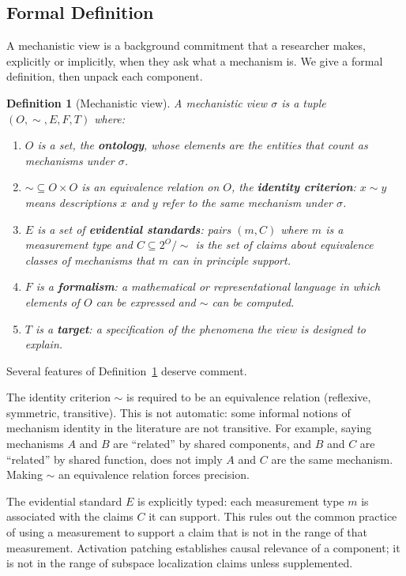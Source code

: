 \documentclass[11pt]{article}
\newtheorem{definition}{Definition}[section]
\theoremstyle{remark}
\newcommand{\view}{\sigma}
\begin{document}
\subsection{Formal Definition}

A mechanistic view is a background commitment that a researcher makes,
explicitly or implicitly, when they ask what a mechanism is.  We give
a formal definition, then unpack each component.

\begin{definition}[Mechanistic view]\label{def:view}
A \emph{mechanistic view} $\view$ is a tuple $(O, {\sim}, E, F, T)$
where:
\begin{enumerate}[leftmargin=*, label=(\roman*)]
\item $O$ is a set, the \textbf{ontology}, whose elements are the
      entities that count as mechanisms under $\view$.
\item ${\sim} \subseteq O \times O$ is an equivalence relation on $O$,
      the \textbf{identity criterion}: $x \sim y$ means descriptions $x$
      and $y$ refer to the same mechanism under $\view$.
\item $E$ is a set of \textbf{evidential standards}: pairs
      $(m, C)$ where $m$ is a measurement type and $C \subseteq
      2^O/{\sim}$ is the set of claims about equivalence classes of
      mechanisms that $m$ can in principle support.
\item $F$ is a \textbf{formalism}: a mathematical or representational
      language in which elements of $O$ can be expressed and $\sim$ can
      be computed.
\item $T$ is a \textbf{target}: a specification of the phenomena the
      view is designed to explain.
\end{enumerate}
\end{definition}

Several features of Definition~\ref{def:view} deserve comment.

The identity criterion $\sim$ is required to be an equivalence relation
(reflexive, symmetric, transitive).  This is not automatic: some
informal notions of mechanism identity in the literature are not
transitive.  For example, saying mechanisms $A$ and $B$ are ``related''
by shared components, and $B$ and $C$ are ``related'' by shared
function, does not imply $A$ and $C$ are the same mechanism.  Making
$\sim$ an equivalence relation forces precision.

The evidential standard $E$ is explicitly typed: each measurement type
$m$ is associated with the claims $C$ it can support.  This rules out
the common practice of using a measurement to support a claim that is
not in the range of that measurement.  Activation patching establishes
causal relevance of a component; it is not in the range of subspace
localization claims unless supplemented.
\end{document}
